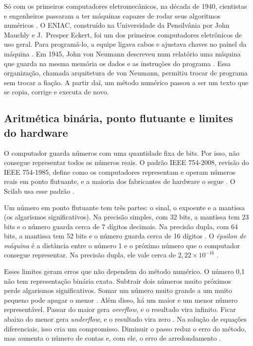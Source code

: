 Só com os primeiros computadores eletromecânicos, na década de 1940, cientistas e engenheiros passaram a ter máquinas capazes de rodar seus algoritmos numéricos \cite[p.~51]{aquino2020}. O ENIAC, construído na Universidade da Pensilvânia por John Mauchly e J.~Presper Eckert, foi um dos primeiros computadores eletrônicos de uso geral. Para programá-lo, a equipe ligava cabos e ajustava chaves no painel da máquina \cite{isaacson2014}. Em 1945, John von Neumann descreveu num relatório uma máquina que guarda na mesma memória os dados e as instruções do programa \cite{isaacson2014}. Essa organização, chamada arquitetura de von Neumann, permitiu trocar de programa sem trocar a fiação. A partir daí, um método numérico passou a ser um texto que se copia, corrige e executa de novo.

\subsection{Aritmética binária, ponto flutuante e limites do hardware}

O computador guarda números com uma quantidade fixa de bits. Por isso, não consegue representar todos os números reais. O padrão IEEE 754-2008, revisão do IEEE 754-1985, define como os computadores representam e operam números reais em ponto flutuante, e a maioria dos fabricantes de hardware o segue \cites{ieee2008}[seção~3.3]{aquino2020}. O Scilab usa esse padrão \cite[p.~57]{aquino2020}.

Um número em ponto flutuante tem três partes: o sinal, o expoente e a mantissa (os algarismos significativos). Na precisão simples, com 32 bits, a mantissa tem 23 bits e o número guarda cerca de 7 dígitos decimais. Na precisão dupla, com 64 bits, a mantissa tem 52 bits e o número guarda cerca de 16 dígitos \cite[p.~58]{aquino2020}. O \emph{épsilon de máquina} é a distância entre o número 1 e o próximo número que o computador consegue representar. Na precisão dupla, ele vale cerca de \(2{,}22\times10^{-16}\) \cite[p.~61]{aquino2020}.

Esses limites geram erros que não dependem do método numérico. O número 0,1 não tem representação binária exata. Subtrair dois números muito próximos perde algarismos significativos. Somar um número muito grande a um muito pequeno pode apagar o menor \cite[seção~3.4]{aquino2020}. Além disso, há um maior e um menor número representável. Passar do maior gera \emph{overflow}, e o resultado vira infinito. Ficar abaixo do menor gera \emph{underflow}, e o resultado vira zero \cite[p.~57]{aquino2020}. Na solução de equações diferenciais, isso cria um compromisso. Diminuir o passo reduz o erro do método, mas aumenta o número de contas e, com ele, o erro de arredondamento \cite[seção~10.6]{aquino2020}.

